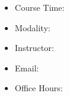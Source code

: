 \begin{itemize}[label={},leftmargin=0pt]
    \item Course Time: \coursetime
    \item Modality: \modality %
    \item Instructor: \instructor
    \item Email: \email
    \item Office Hours: \officehours
\end{itemize}